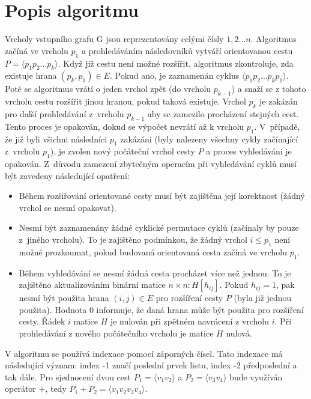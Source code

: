     \section{Popis algoritmu}
    Vrcholy vstupního grafu G jsou reprezentovány celými čísly $1,2\dots n$. Algoritmus začíná ve vrcholu $p_1$ a prohledáváním následovníků vytváří orientovanou cestu $P=\langle p_1p_2\dots p_k\rangle$. Když již cestu není možné rozšířit, algoritmus zkontroluje, zda existuje hrana $(p_k, p_1) \in E$. Pokud ano, je zaznamenán cyklus $\langle p_1p_2\dots p_kp_1\rangle$. Poté se algoritmus vrátí o jeden vrchol zpět (do vrcholu $p_{k-1}$) a snaží se z tohoto vrcholu cestu rozšířit jinou hranou, pokud taková existuje. Vrchol $p_k$ je zakázán pro další prohledávání z~vrcholu $p_{k-1}$ aby se zamezilo procházení stejných cest. Tento proces je opakován, dokud se výpočet nevrátí až k vrcholu $p_1$. V~případě, že již byli všichni následníci $p_1$ zakázáni (byly nalezeny všechny cykly začínající z~vrcholu $p_1$), je zvolen nový počáteční vrchol cesty $P$ a proces vyhledávání je opakován. Z~důvodu zamezení zbytečným operacím při vyhledávání cyklů musí být zavedeny následující opatření:
    \begin{itemize}
        \item Během rozšiřování orientované cesty musí být zajištěna její korektnost (žádný vrchol se nesmí opakovat).
        \item Nesmí být zaznamenány žádné cyklické permutace cyklů (začínaly by pouze z~jiného vrcholu). To je zajištěno podmínkou, že žádný vrchol $i\leq p_1$ není možné prozkoumat, pokud budovaná orientovaná cesta začíná ve vrcholu $p_1$.
        \item Během vyhledávání se nesmí žádná cesta procházet více než jednou. To je zajištěno aktualizováním binární matice $n \times n : H[h_{i j}]$. Pokud $h_{ij} = 1$, pak nesmí být použita hrana $(i, j) \in E$ pro rozšíření cesty $P$ (byla již jednou použita). Hodnota 0 informuje, že daná hrana může být použita pro rozšíření cesty. Řádek $i$ matice $H$ je nulován při zpětném navrácení z vrcholu $i$. Při prohledávání z nového počátečního vrcholu je matice $H$ nulová.
    \end{itemize}

    V algoritmu se používá indexace pomocí záporných čísel. Tato indexace má následující význam: index -1 značí poslední prvek listu, index -2 předposlední a tak dále. Pro sjednocení dvou cest $P_1 = \langle v_1v_2 \rangle$ a $P_2 = \langle v_3v_4 \rangle$ bude využíván operátor $+$, tedy $P_1 + P_2 = \langle v_1v_2v_3v_4 \rangle$.

